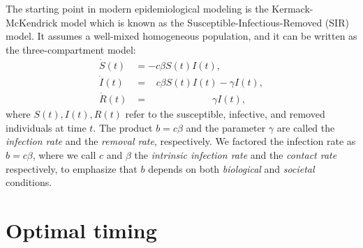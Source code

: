 The starting point in modern epidemiological modeling   is the Kermack-McKendrick model  \cite{kermack1927contribution, hethcote00} which is known as the Susceptible-Infectious-Removed (SIR) model. It assumes a well-mixed homogeneous population, and it can be written as the three-compartment model:
\begin{align}\nonumber
	\dot S(t) &= %
	-c\beta S(t) I(t),  \\ \label{sir}
	\dot I(t) &=  \;\;\; c\beta  S(t) I(t)  - \gamma I(t), \\ \nonumber
	\dot R(t) &= \qquad\qquad\qquad\;\; \gamma I(t),
\end{align}
where $S(t),I(t),R(t)$ refer to the susceptible, infective, and removed individuals at time $t$. 
The product $b=c\beta$ and the parameter $\gamma$ are called the \emph{infection rate} and the \emph{removal rate}, respectively.  We factored the infection rate as $b=c\beta$, where we call $c$ and $\beta$ the \emph{intrinsic infection rate} and the \emph{contact rate} respectively, to emphasize that $b$ depends on both \emph{biological} and \emph{societal} conditions. 

\section{Optimal timing}
\label{sec:sd}

